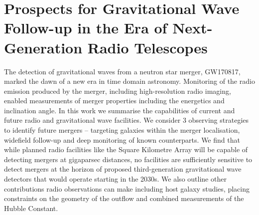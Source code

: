 \chapter{Prospects for Gravitational Wave Follow-up in the Era of Next-Generation Radio Telescopes}
\label{chap:radio_gw_detectability}

\begingroup




\endgroup

The detection of gravitational waves from a neutron star merger, GW170817, marked the dawn of a new era in time domain astronomy. Monitoring of the radio emission produced by the merger, including high-resolution radio imaging, enabled measurements of merger properties including the energetics and inclination angle. In this work we summarise the capabilities of current and future radio and gravitational wave facilities. We consider 3 observing strategies to identify future mergers -- targeting galaxies within the merger localisation, widefield follow-up and deep monitoring of known counterparts. We find that while planned radio facilities like the Square Kilometre Array will be capable of detecting mergers at gigaparsec distances, no facilities are sufficiently sensitive to detect mergers at the horizon of proposed third-generation gravitational wave detectors that would operate starting in the 2030s. We also outline other contributions radio observations can make including host galaxy studies, placing constraints on the geometry of the outflow and combined measurements of the Hubble Constant.

